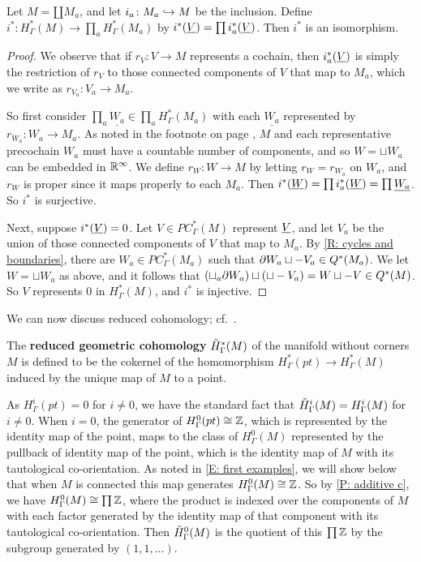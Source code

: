 \begin{proposition}\label{P: additive c}
Let $M = \amalg{M_a}$, and let $i_a \colon M_a \hookrightarrow M$ be the inclusion.
Define $i^* \colon H^*_\Gamma(M) \to \prod_a H^*_\Gamma(M_a)$ by $i^*(\underline{V}) = \prod i^*_a(\underline{V})$.
Then $i^*$ is an isomorphism.
\end{proposition}
\begin{proof}
We observe that if $r_V \colon V \to M$ represents a cochain, then $i^*_a(\underline{V})$ is simply the restriction of $r_V$ to those connected components of $V$ that map to $M_a$, which we write as $r_{V_a} \colon V_a \to M_a$.


So first consider $\prod_a \underline{W_a} \in \prod_a H^*_\Gamma(M_a)$ with each $\underline{W_a}$ represented by $r_{W_a} \colon W_a \to M_a$.
As noted in the footnote on page \pageref{F: countable}, $M$ and each representative precochain $W_a$ must have a countable number of components, and so $W = \sqcup W_a$ can be embedded in $\mathbb{R}^\infty$.
We define $r_W \colon W \to M$ by letting $r_W = r_{W_a}$ on $W_a$, and $r_W$ is proper since it maps properly to each $M_a$.
Then $i^*(\underline{W}) = \prod i^*_a(\underline{W}) = \prod \underline{W_a}$.
So $i^*$ is surjective.

Next, suppose $i^*(\underline{V}) = 0$.
Let $V \in PC^*_\Gamma(M)$ represent $\underline{V}$, and let $V_a$ be the union of those connected components of $V$ that map to $M_a$.
By \cref{R: cycles and boundaries}, there are $W_a \in PC^*_\Gamma(M_a)$ such that $\partial W_a \sqcup -V_a \in Q^*(M_a)$.
We let $W = \sqcup W_a$ as above, and it follows that $(\sqcup_a \partial W_a) \sqcup (\sqcup -V_a) = W \sqcup -V \in Q^*(M)$.
So $V$ represents $0$ in $H^*_\Gamma(M)$, and $i^*$ is injective.
\end{proof}


We can now discuss reduced cohomology; cf.\ \cite[page 240]{Span81}.

\begin{definition}\label{D: reduced c}
The \textbf{reduced geometric cohomology} $\tilde H^*_\Gamma(M)$ of the manifold without corners $M$ is defined to be the cokernel of the homomorphism $H^*_\Gamma(pt)\to H^*_\Gamma(M)$ induced by the unique map of $M$ to a point.

As $H^i_\Gamma(pt) = 0$ for $i \neq 0$, we have the standard fact that  $\tilde H^i_\Gamma(M) = H^i_\Gamma(M)$ for $i \neq 0$.
When $i=0$, the generator of $H^0_\Gamma(pt) \cong \mathbb{Z}$, which is represented by the identity map of the point, maps to the class of $H^0_\Gamma(M)$ represented by the pullback of identity map of the point, which is the identity map of $M$ with its tautological co-orientation.
As noted in \cref{E: first examples}, we will show below that when $M$ is connected this map generates $H^0_\Gamma(M) \cong \mathbb{Z}$.
So by \cref{P: additive c}, we have $H^0_\Gamma(M) \cong \prod \mathbb{Z}$, where the product is indexed over the components of $M$ with each factor generated by the identity map of that component with its tautological co-orientation.
Then $\tilde H^0_\Gamma(M)$ is the quotient of this $\prod \mathbb{Z}$ by the subgroup generated by $(1,1,\ldots)$.
\end{definition}




